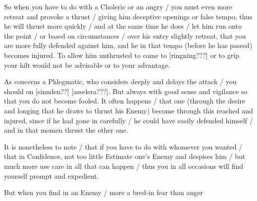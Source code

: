 
So when you have to do with a Choleric or an angry / you must even
more retreat and provoke a thrust / giving him deceptive openings or
false tempo, thus he will thrust more quickly / and at the same time
he does / let him run onto the point / or based on circumstances /
over his entry slightly retreat, that you are more fully defended
against him, and he in that tempo (before he has passed) becomes
injured. To allow him unthrusted to come to
[ringning???] or to grip
your hilt would not be advisable or to your advantage.


As concerns a Phlegmatic, who considers deeply and delays the attack /
you should on [sinnden??] [asselera???]. But always with good sense and
vigilance so that you do not become fooled. It often happens / that
one (through the desire and longing that he draws to thrust his Enemy)
become through this reached and injured, since if he had gone in
carefully / he could have easily defended himself / and in that momen
thrust the other one.


It is nonetheless to note / that if you have to do with whomever you
wanted / that in Confidence, not too little Estimate one's Enemy and
despises him / but much more use care in all that can happen / thus
you in all occasions will find yourself prompt and expedient.


But when you find in an Enemy / more a bred-in fear than anger